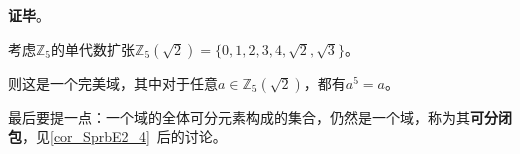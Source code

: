 \textbf{证毕}。


\begin{example}{}\label{ex_SprbEx_3}
考虑$\mathbb{Z}_5$的单代数扩张$\mathbb{Z}_5(\sqrt{2})=\{0, 1, 2, 3, 4, \sqrt{2}, \sqrt{3}\}$。

则这是一个完美域，其中对于任意$a\in\mathbb{Z}_5(\sqrt{2})$，都有$a^5=a$。
\end{example}


最后要提一点：一个域的全体可分元素构成的集合，仍然是一个域，称为其\textbf{可分闭包}，见\autoref{cor_SprbE2_4}~后的讨论。







































